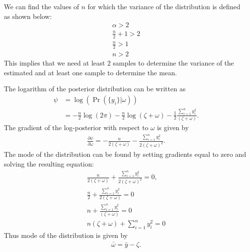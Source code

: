 \documentclass[11pt,twoside,a4paper]{article}
\begin{document}
  We can find the values of $n$ for which the variance of the distribution is
  defined as shown below:
  \begin{align}
    \alpha > 2 \\
    \frac{n}{2} + 1 > 2 \\
    \frac{n}{2} > 1 \\
    \boxed{n > 2}
  \end{align}
  This implies that we need at least 2 samples to determine the variance of the
  estimated and at least one sample to determine the mean.

  The logarithm of the posterior distribution can be written as
  \begin{align}
    \psi &= \log \left(\Pr \left(\{y_i\} | \omega \right) \right) \\
    &= -\frac{n}{2}\log(2 \pi) - \frac{n}{2}\log(\zeta + \omega)
      -\frac{1}{2} \frac{\sum_{i=1}^n y_i^2}{(\zeta + \omega)}.
  \end{align}
  The gradient of the log-posterior with respect to $\omega$ is given by
  \begin{align}
    \frac{\partial \psi}{\partial \omega} = -\frac{n}{2 (\zeta + \omega)}
      - \frac{\sum_{i=1}^n y_i^2}{2 (\zeta + \omega)^2}.
  \end{align}
  The mode of the distribution can be found by setting gradients equal to zero
  and solving the resulting equation:
  \begin{align}
    \frac{n}{2 (\zeta + \omega)}
      + \frac{\sum_{i=1}^n y_i^2}{2 (\zeta + \omega)^2} = 0, \\
    \frac{n}{2} + \frac{\sum_{i=1}^n y_i^2}{2 (\zeta + \omega)} = 0 \\
    n + \frac{\sum_{i=1}^n y_i^2}{(\zeta + \omega)} = 0 \\
    n (\zeta + \omega) + \sum_{i=1}^n y_i^2 = 0
  \end{align}
  Thus mode of the distribution is given by
  \begin{align}
    \boxed{\bar{\omega} = \bar{y} - \zeta.}
  \end{align}
\end{document}

